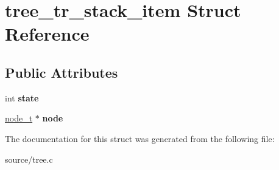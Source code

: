 \hypertarget{structtree__tr__stack__item}{}\section{tree\+\_\+tr\+\_\+stack\+\_\+item Struct Reference}
\label{structtree__tr__stack__item}
\subsection*{Public Attributes}
\begin{DoxyCompactItemize}
\item 
int {\bfseries state}\hypertarget{structtree__tr__stack__item_a73b4c42f8cd9bf5ccff9289eabe43335}{}\label{structtree__tr__stack__item_a73b4c42f8cd9bf5ccff9289eabe43335}

\item 
\hyperlink{structtree__node}{node\+\_\+t} $\ast$ {\bfseries node}\hypertarget{structtree__tr__stack__item_a8ff970274ebeedf83a2f0b74d7faca09}{}\label{structtree__tr__stack__item_a8ff970274ebeedf83a2f0b74d7faca09}

\end{DoxyCompactItemize}


The documentation for this struct was generated from the following file\+:\begin{DoxyCompactItemize}
\item 
source/tree.\+c\end{DoxyCompactItemize}
